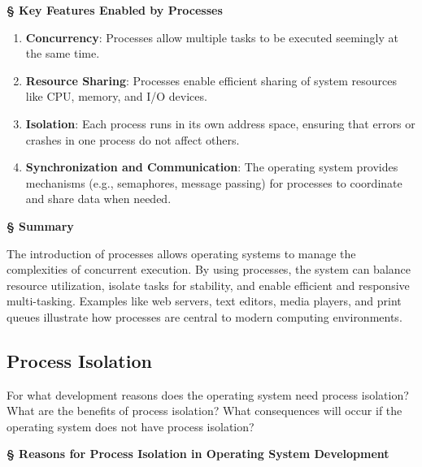 \documentclass[a4paper]{book}
\newcommand{\sfbf}[1]{{\normalsize\textsf{\textbf{§ #1}}}}
\begin{document}
\hrulefill

\sfbf{Key Features Enabled by Processes}
\begin{enumerate}
\item 
\textbf{Concurrency}: Processes allow multiple tasks to be executed seemingly at the same time.

\item 
\textbf{Resource Sharing}: Processes enable efficient sharing of system resources like CPU, memory, and I/O devices.

\item 
\textbf{Isolation}: Each process runs in its own address space, ensuring that errors or crashes in one process do not affect others.

\item 
\textbf{Synchronization and Communication}: The operating system provides mechanisms (e.g., semaphores, message passing) for processes to coordinate and share data when needed.

\end{enumerate}
\hrulefill

\sfbf{Summary}

The introduction of processes allows operating systems to manage the complexities of concurrent execution. By using processes, the system can balance resource utilization, isolate tasks for stability, and enable efficient and responsive multi-tasking. Examples like web servers, text editors, media players, and print queues illustrate how processes are central to modern computing environments.

\subsection{Process Isolation}

\begin{greenbox}
For what development reasons does the operating system need process isolation? What are the benefits of process isolation? What consequences will occur if the operating system does not have process isolation?
\end{greenbox}

\sfbf{Reasons for Process Isolation in Operating System Development}
\end{document}
